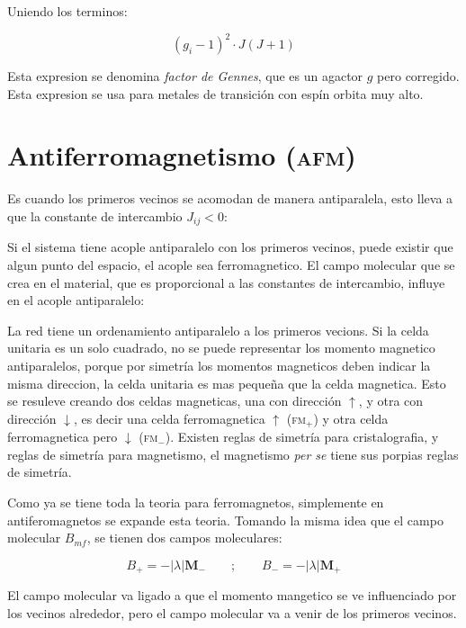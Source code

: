 \documentclass[11pt,fleqn]{book}
\renewcommand{\vec}[1]{\mathbf{#1}}
\begin{document}
Uniendo los terminos:

\begin{equation}
    (g_{i}-1)^{2}\cdot J(J+1)
    \label{Eq. 6.21}
\end{equation}

Esta expresion se denomina \textit{factor de Gennes}, que es un agactor $g$ pero corregido. Esta expresion se usa para metales de transición con espín orbita muy alto.


\section{Antiferromagnetismo (\textsc{afm})}

Es cuando los primeros vecinos se acomodan de manera antiparalela, esto lleva a que la constante de intercambio $J_{ij}<0$:


Si el sistema tiene acople antiparalelo con los primeros vecinos, puede existir que algun punto del espacio, el acople sea ferromagnetico. El campo molecular que se crea en el material, que es proporcional a las constantes de intercambio, influye en el acople antiparalelo:




La red tiene un ordenamiento antiparalelo a los primeros vecions. Si la celda unitaria es un solo cuadrado, no se puede representar los momento magnetico antiparalelos, porque por simetría los momentos magneticos deben indicar la misma direccion, la celda unitaria es mas pequeña que la celda magnetica. Esto se resuleve creando dos celdas magneticas, una con dirección $\uparrow$, y otra con dirección $\downarrow$, es decir una celda ferromagnetica $\uparrow$ (\textsc{fm}$_{+}$) y otra celda ferromagnetica pero $\downarrow$ (\textsc{fm}$_{-}$). Existen reglas de simetría para cristalografia, y reglas de simetría para magnetismo, el magnetismo \emph{per se} tiene sus porpias reglas de simetría.

Como ya se tiene toda la teoria para ferromagnetos, simplemente en antiferomagnetos se expande esta teoria. Tomando la misma idea que el campo molecular $B_{mf}$, se tienen dos campos moleculares:

\begin{equation*}
    B_{+}=-|\lambda|\vec{M}_{-}\qquad;\qquad B_{-}=-|\lambda|\vec{M}_{+}
\end{equation*}

\begin{remark}
El campo molecular va ligado a que el momento mangetico se ve influenciado por los vecinos alrededor, pero el campo molecular va a venir de los primeros vecinos.
\end{remark}
\end{document}
